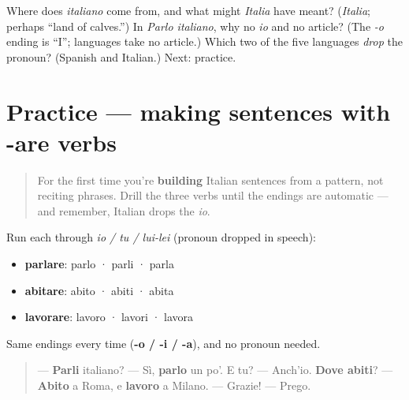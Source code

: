 \begin{tcolorbox}[breakable,colback=teal!4,colframe=teal!35!black,title={Before you move on}]
Where does \emph{italiano} come from, and what might \emph{Italia} have meant? (\emph{Italia}; perhaps \textquotedblleft{}land of calves.\textquotedblright{}) In \emph{Parlo italiano}, why no \emph{io} and no article? (The \emph{-o} ending is \textquotedblleft{}I\textquotedblright{}; languages take no article.) Which two of the five languages \emph{drop} the pronoun? (Spanish and Italian.) Next: practice.
\end{tcolorbox}
\section[Practice]{Practice — making sentences with -are verbs}

\label{lesson:IT-C05-practice}



\begin{quote}
For the first time you're \textbf{building} Italian sentences from a pattern, not reciting phrases. Drill the three verbs until the endings are automatic — and remember, Italian drops the \emph{io}.
\end{quote}

\begin{grammarlens}[title={Grammar Lens: conjugate on command}]
Run each through \emph{io / tu / lui-lei} (pronoun dropped in speech):

\begin{itemize}
\raggedright
  \item \textbf{parlare}: parlo · parli · parla
  \item \textbf{abitare}: abito · abiti · abita
  \item \textbf{lavorare}: lavoro · lavori · lavora
\end{itemize}

Same endings every time (\textbf{-o / -i / -a}), and no pronoun needed.
\end{grammarlens}

\begin{grammarlens}[title={Grammar Lens: say something real}]
\begin{quote}
— \textbf{Parli} italiano? — Sì, \textbf{parlo} un po'. E tu? — Anch'io. \textbf{Dove abiti}? — \textbf{Abito} a Roma, e \textbf{lavoro} a Milano. — Grazie! — Prego.
\end{quote}
\end{grammarlens}

